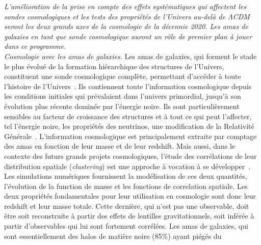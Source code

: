 \emph{L'amélioration de la prise en compte des effets systématiques
qui affectent les sondes cosmologiques et les tests des propriétés de
l'Univers au-delà de $\Lambda$CDM seront les deux grands axes de la
cosmologie de la décennie 2020. Les amas de galaxies en tant que sonde
cosmologique auront un rôle de premier plan à jouer dans ce programme.}\\


\emph{Cosmologie avec les amas de galaxies.}
Les amas de galaxies, qui forment le stade le plus évolué
de la formation hiérarchique des structures de l’Univers, constituent
une sonde cosmologique complète, permettant d’accéder à toute l’histoire de
l’Univers~\citep{Allen2011}. Ils contiennent toute l’information
cosmologique depuis les conditions initiales qui prévalaient dans
l’univers primordial, jusqu’à son évolution plus récente dominée par
l’énergie noire. Ils sont particulièrement sensibles au facteur de
croissance des structures et à tout ce qui peut l’affecter, tel l'énergie
noire, les propriétés des neutrinos, une modification de la Relativité
Générale~\citep{Haiman2001, Wang2005, Bolliet2019, Mohr2003,
Hagstotz2019}.
L’information cosmologique est principalement extraite par comptage
des amas en fonction de leur masse et de leur redshift. Mais aussi,
dans le contexte des futurs grands projets cosmologiques, l’étude des
corrélations de leur distribution spatiale (\emph{clustering}) est une
approche à vocation à se développer~\citep[e.g.][]{Mana2013}. Les
simulations numériques fournissent la modélisation de ces deux
quantités, l'évolution de la function de masse et les fonctions de
correlation spatiale. Les deux propriétés fondamentales pour leur
utilisation en cosmologie sont donc leur redshift et leur masse
totale. Cette dernière, qui
n'est pas une observable, doit être soit reconstruite à partir des
effets de lentilles gravitationnels, soit inférée à partir
d'observables qui lui sont fortement corrélées. Les amas de galaxies,
qui sont essentiellement des halos de matière noire (85$\%$) ayant piégés du
